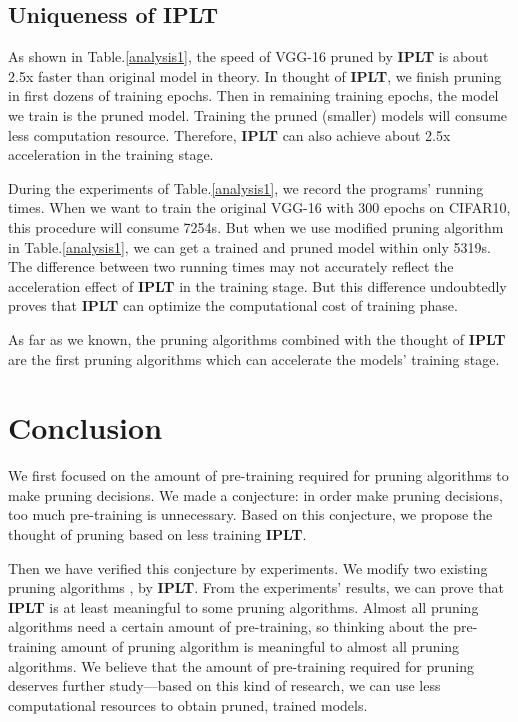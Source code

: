 \documentclass[runningheads]{llncs}
\begin{document}
\subsection{Uniqueness of \textbf{IPLT}}

As shown in Table.\ref{analysis1}, the speed of VGG-16 pruned by \textbf{IPLT} is about 2.5x faster than original model in theory. In thought of \textbf{IPLT}, we finish pruning in first dozens of training epochs. Then in remaining training epochs, the model we train is the pruned model. Training the pruned (smaller) models will consume less computation resource. Therefore, \textbf{IPLT} can also achieve about 2.5x acceleration in the training stage.

During the experiments of Table.\ref{analysis1}, we record the programs' running times. When we want to train the original VGG-16 with 300 epochs on CIFAR10, this procedure will consume 7254s. But when we use modified pruning algorithm in Table.\ref{analysis1}, we can get a trained and pruned model within only 5319s. The difference between two running times may not accurately reflect the acceleration effect of \textbf{IPLT} in the training stage. But this difference undoubtedly proves that \textbf{IPLT} can optimize the computational cost of training phase.

As far as we known, the pruning algorithms combined with the thought of \textbf{IPLT} are the first pruning algorithms which can accelerate the models' training stage.


\section{Conclusion}

We first focused on the amount of pre-training required for pruning algorithms to make pruning decisions. We made a conjecture: in order make pruning decisions, too much pre-training is unnecessary. Based on this conjecture, we propose the thought of pruning based on less training \textbf{IPLT}.

Then we have verified this conjecture by experiments. We modify two existing pruning algorithms \cite{b35}, \cite{b27} by \textbf{IPLT}. From the experiments' results, we can prove that \textbf{IPLT} is at least meaningful to some pruning algorithms. Almost all pruning algorithms need a certain amount of pre-training, so thinking about the pre-training amount of pruning algorithm is meaningful to almost all pruning algorithms. We believe that the amount of pre-training required for pruning deserves further study---based on this kind of research, we can use less computational resources to obtain pruned, trained models.
\end{document}
